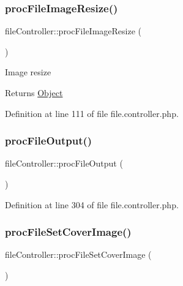 \subsubsection{\texorpdfstring{proc\+File\+Image\+Resize()}{procFileImageResize()}}
{\footnotesize\ttfamily file\+Controller\+::proc\+File\+Image\+Resize (\begin{DoxyParamCaption}{ }\end{DoxyParamCaption})}

Image resize

\begin{DoxyReturn}{Returns}
\hyperlink{classObject}{Object} 
\end{DoxyReturn}


Definition at line 111 of file file.\+controller.\+php.

\mbox{\label{classfileController_a21d4fb5d44f6f078cc9d63b89e642dce}} 
\subsubsection{\texorpdfstring{proc\+File\+Output()}{procFileOutput()}}
{\footnotesize\ttfamily file\+Controller\+::proc\+File\+Output (\begin{DoxyParamCaption}{ }\end{DoxyParamCaption})}



Definition at line 304 of file file.\+controller.\+php.

\mbox{\label{classfileController_a54e65e695efa22b2a9507fd52e44d601}} 
\subsubsection{\texorpdfstring{proc\+File\+Set\+Cover\+Image()}{procFileSetCoverImage()}}
{\footnotesize\ttfamily file\+Controller\+::proc\+File\+Set\+Cover\+Image (\begin{DoxyParamCaption}{ }\end{DoxyParamCaption})}



